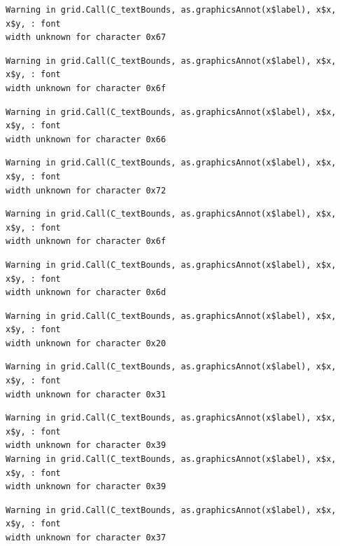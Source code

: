 \documentclass[
  letterpaper,
]{scrbook}
\begin{document}
\begin{verbatim}
Warning in grid.Call(C_textBounds, as.graphicsAnnot(x$label), x$x, x$y, : font
width unknown for character 0x67
\end{verbatim}

\begin{verbatim}
Warning in grid.Call(C_textBounds, as.graphicsAnnot(x$label), x$x, x$y, : font
width unknown for character 0x6f
\end{verbatim}

\begin{verbatim}
Warning in grid.Call(C_textBounds, as.graphicsAnnot(x$label), x$x, x$y, : font
width unknown for character 0x66
\end{verbatim}

\begin{verbatim}
Warning in grid.Call(C_textBounds, as.graphicsAnnot(x$label), x$x, x$y, : font
width unknown for character 0x72
\end{verbatim}

\begin{verbatim}
Warning in grid.Call(C_textBounds, as.graphicsAnnot(x$label), x$x, x$y, : font
width unknown for character 0x6f
\end{verbatim}

\begin{verbatim}
Warning in grid.Call(C_textBounds, as.graphicsAnnot(x$label), x$x, x$y, : font
width unknown for character 0x6d
\end{verbatim}

\begin{verbatim}
Warning in grid.Call(C_textBounds, as.graphicsAnnot(x$label), x$x, x$y, : font
width unknown for character 0x20
\end{verbatim}

\begin{verbatim}
Warning in grid.Call(C_textBounds, as.graphicsAnnot(x$label), x$x, x$y, : font
width unknown for character 0x31
\end{verbatim}

\begin{verbatim}
Warning in grid.Call(C_textBounds, as.graphicsAnnot(x$label), x$x, x$y, : font
width unknown for character 0x39
Warning in grid.Call(C_textBounds, as.graphicsAnnot(x$label), x$x, x$y, : font
width unknown for character 0x39
\end{verbatim}

\begin{verbatim}
Warning in grid.Call(C_textBounds, as.graphicsAnnot(x$label), x$x, x$y, : font
width unknown for character 0x37
\end{verbatim}
\end{document}
